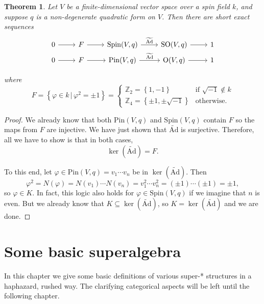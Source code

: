 \documentclass[a4paper]{report}
\newcommand{\Z}{\mathbb{Z}}
\newcommand{\tAd}{\widetilde{\mathrm{Ad}}}
\newcommand{\Pin}{\mathrm{Pin}}
\newcommand{\Spin}{\mathrm{Spin}}
\newcommand{\Or}{\mathrm{O}}
\newcommand{\SO}{\mathrm{SO}}
\theoremstyle{definition}
\theoremstyle{plain}
\newtheorem{theorem}{Theorem}[section]
\theoremstyle{remark}
\begin{document}
\begin{theorem}
  Let $V$ be a finite-dimensional vector space over a spin field $k$, and suppose $q$ is a non-degenerate quadratic form on $V$. Then there are short exact sequences
  \begin{equation*}
    \begin{tikzcd}[row sep=tiny]
      0 \arrow[r] & F \arrow[r] & \arrow[r, "\tAd"] \Spin(V, q) & \arrow[r] \SO(V, q) & 1 \\
      0 \arrow[r] & F \arrow[r] & \Pin(V, q) \arrow[r, "\tAd"] & \arrow[r] \Or(V, q) & 1 \\
    \end{tikzcd}
  \end{equation*}
  where
  \begin{equation*}
    F = \left\{ \varphi \in k\,\big|\, \varphi^{2} = \pm 1 \right\} =
    \begin{cases}
      \Z_{2} = \left\{ 1, -1 \right\} & \text{if } \sqrt{-1} \notin k \\
      \Z_{4} = \left\{\pm 1, \pm \sqrt{-1}\right\} & \text{otherwise.}
    \end{cases}
  \end{equation*}
\end{theorem}
\begin{proof}
  We already know that both $\Pin(V, q)$ and $\Spin(V, q)$ contain $F$ so the maps from $F$ are injective. We have just shown that $\tAd$ is surjective. Therefore, all we have to show is that in both cases,
  \begin{equation*}
    \ker(\tAd) = F.
  \end{equation*}

  To this end, let $\varphi \in \Pin(V, q) = v_{1}\cdots v_{n}$ be in $\ker(\tAd)$. Then
  \begin{equation*}
    \varphi^{2} = N(\varphi) = N(v_{1})\cdots N(v_{n}) = v_{1}^{2} \cdots v_{n}^{2} = (\pm 1)\cdots (\pm 1) = \pm 1,
  \end{equation*}
  so $\varphi \in K$. In fact, this logic also holds for $\varphi \in \Spin(V, q)$ if we imagine that $n$ is even. But we already know that $K \subseteq \ker(\tAd)$, so $K = \ker(\tAd)$ and we are done.
\end{proof}

\chapter{Some basic superalgebra} 
In this chapter we give some basic definitions of various super-* structures in a haphazard, rushed way. The clarifying categorical aspects will be left until the following chapter.
\end{document}
